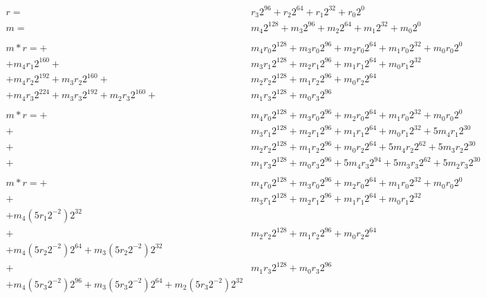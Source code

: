 \documentclass[12pt]{article}
\begin{document}
\begin{align*}
r= & r_{3}2^{96} + r_{2}2^{64} + r_{1}2^{32} + r_{0}2^0\\
m= & m_{4}2^{128} + m_{3}2^{96} + m_{2}2^{64} + m_{1}2^{32} + m_{0}2^0\\
\\
m \ast r =
+ & m_{4}r_{0}2^{128} +  m_{3}r_{0}2^{96}  +  m_{2}r_{0}2^{64}  +  m_{1}r_{0}2^{32}  + m_{0}r_{0}2^0\\
+   m_{4}r_{1}2^{160} +& m_{3}r_{1}2^{128} +  m_{2}r_{1}2^{96}  +  m_{1}r_{1}2^{64}  + m_{0}r_{1}2^{32}\\
+   m_{4}r_{2}2^{192} +  m_{3}r_{2}2^{160} +& m_{2}r_{2}2^{128} +  m_{1}r_{2}2^{96}  + m_{0}r_{2}2^{64}\\
+   m_{4}r_{3}2^{224} +  m_{3}r_{3}2^{192} +  m_{2}r_{3}2^{160} +& m_{1}r_{3}2^{128} + m_{0}r_{3}2^{96}\\
\\
m \ast r =
+ & m_{4}r_{0}2^{128} + m_{3}r_{0}2^{96} + m_{2}r_{0}2^{64}  + m_{1}r_{0}2^{32}  + m_{0}r_{0}2^0\\
+ & m_{3}r_{1}2^{128} + m_{2}r_{1}2^{96} + m_{1}r_{1}2^{64}  + m_{0}r_{1}2^{32}  + 5m_{4}r_{1}2^{30} \\
+ & m_{2}r_{2}2^{128} + m_{1}r_{2}2^{96} + m_{0}r_{2}2^{64}  + 5m_{4}r_{2}2^{62} + 5m_{3}r_{2}2^{30}\\
+ & m_{1}r_{3}2^{128} + m_{0}r_{3}2^{96} + 5m_{4}r_{3}2^{94} + 5m_{3}r_{3}2^{62} + 5m_{2}r_{3}2^{30} \\
\\
m \ast r =
+ & m_{4}r_{0}2^{128} + m_{3}r_{0}2^{96} + m_{2}r_{0}2^{64}  + m_{1}r_{0}2^{32}  + m_{0}r_{0}2^0\\
+ & m_{3}r_{1}2^{128} + m_{2}r_{1}2^{96} + m_{1}r_{1}2^{64}  + m_{0}r_{1}2^{32}  \\
                                                             + m_{4}(5r_{1}2^{-2})2^{32} \\
+ & m_{2}r_{2}2^{128} + m_{1}r_{2}2^{96} + m_{0}r_{2}2^{64}  \\
                                         + m_{4}(5r_{2}2^{-2})2^{64} + m_{3}(5r_{2}2^{-2})2^{32}\\
+ & m_{1}r_{3}2^{128} + m_{0}r_{3}2^{96} \\
                      + m_{4}(5r_{3}2^{-2})2^{96} + m_{3}(5r_{3}2^{-2})2^{64} + m_{2}(5r_{3}2^{-2})2^{32} \\
\end{align*}
\end{document}
